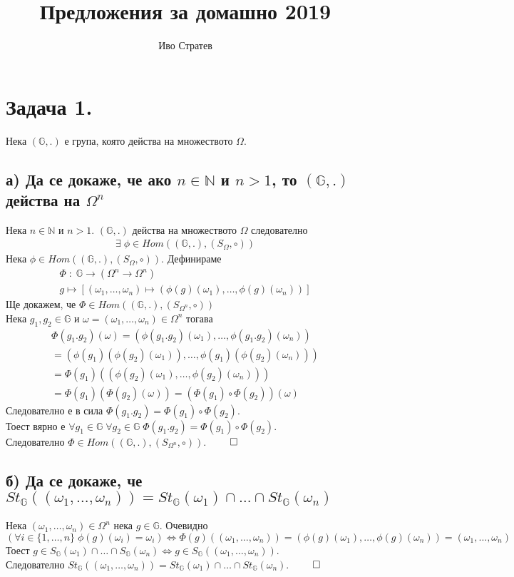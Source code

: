\documentclass[a4paper, 12pt, oneside]{article}
\title{Предложения за домашно 2019}
\author{Иво Стратев}
\newcommand{\N}{\mathbb{N}}
\newcommand{\G}{\mathbb{G}}
\begin{document}
\maketitle
\section*{Задача 1.}
Нека \((\G, .)\) е група, която действа на множеството \(\Omega\).
\subsection*{а) Да се докаже, че ако \(n \in \N\) и \(n > 1\), то \((\G, .)\) действа на \(\Omega^n\)}
Нека \(n \in \N\) и \(n > 1\).
\((\G, .)\) действа на множеството \(\Omega\) следователно
\begin{align*}
    \exists \; \phi \in Hom((\G, .), (S_\Omega, \circ))
\end{align*}
Нека \(\phi \in Hom((\G, .), (S_\Omega, \circ))\).
Дефинираме
\begin{align*}
    \Phi \; : \; \G \to (\Omega^n \to \Omega^n) \\
    g \mapsto [(\omega_1, \dots, \omega_n) \mapsto (\phi(g)(\omega_1), \dots, \phi(g)(\omega_n))]
\end{align*}
Ще докажем, че \(\Phi \in Hom((\G, .), (S_{\Omega^n}, \circ))\) \\
Нека \(g_1, g_2 \in \G\) и \(\omega = (\omega_1, \dots, \omega_n) \in \Omega^n\) тогава
\begin{align*}
   \Phi(g_1.g_2)(\omega) = (\phi(g_1.g_2)(\omega_1), \dots, \phi(g_1.g_2)(\omega_n)) \\
   = (\phi(g_1)(\phi(g_2)(\omega_1)), \dots, \phi(g_1)(\phi(g_2)(\omega_n))) \\
   = \Phi(g_1)((\phi(g_2)(\omega_1), \dots, \phi(g_2)(\omega_n))) \\
   = \Phi(g_1)(\Phi(g_2)(\omega)) = (\Phi(g_1) \circ \Phi(g_2))(\omega)
\end{align*}
Следователно е в сила \(\Phi(g_1.g_2) = \Phi(g_1) \circ \Phi(g_2)\). \\
Тоест вярно е \(\forall g_1 \in \G \; \forall g_2 \in \G \; \Phi(g_1.g_2) = \Phi(g_1) \circ \Phi(g_2)\). \\
Следователно \(\Phi \in Hom((\G, .), (S_{\Omega^n}, \circ))\). \(\qed\)
\subsection*{б) Да се докаже, че \(St_\G((\omega_1, \dots, \omega_n)) =  St_\G(\omega_1) \cap \dots \cap St_\G(\omega_n)\)}
Нека \((\omega_1, \dots, \omega_n) \in \Omega^n\) нека \(g \in \G\). Очевидно
\((\forall i \in \{1, \dots, n\} \; \phi(g)(\omega_i) = \omega_i) \iff \Phi(g)((\omega_1, \dots, \omega_n)) = (\phi(g)(\omega_1), \dots, \phi(g)(\omega_n)) = (\omega_1, \dots, \omega_n)\) \\
Тоест \(g \in S_\G(\omega_1) \cap \dots \cap S_\G(\omega_n) \iff g \in S_\G((\omega_1, \dots, \omega_n))\). \\
Следователно \(St_\G((\omega_1, \dots, \omega_n)) =  St_\G(\omega_1) \cap \dots \cap St_\G(\omega_n)\). \(\qed\)
\end{document}
